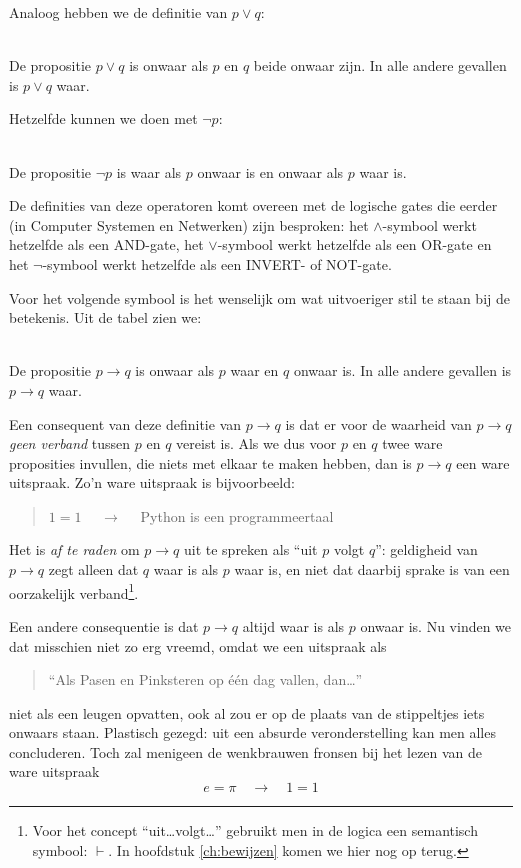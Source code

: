 Analoog hebben we de definitie van $p\lor q$:
\begin{definition}[Disjunctie]\label{def:disj}\mbox{}\\
De propositie $p\lor q$ is onwaar als $p$ en $q$ beide onwaar zijn. In alle andere gevallen is $p\lor q$ waar.
\end{definition}

Hetzelfde kunnen we doen met $\neg p$:
\begin{definition}[Negatie]\label{def:neg}\mbox{}\\
De propositie $\neg p$ is waar als $p$ onwaar is en onwaar als $p$ waar is.
\end{definition}

De definities van deze operatoren komt overeen met de logische gates die eerder (in Computer Systemen en Netwerken) zijn besproken: het $\land$-symbool werkt hetzelfde als een AND-gate, het $\lor$-symbool werkt hetzelfde als een OR-gate en het $\neg$-symbool werkt hetzelfde als een INVERT- of NOT-gate.

Voor het volgende symbool is het wenselijk om wat uitvoeriger stil te staan bij de betekenis. Uit de tabel zien we:
\begin{definition}[Implicatie]\label{def:impl}\mbox{}\\
De propositie $p\rightarrow q$ is onwaar als $p$ waar en $q$ onwaar is. In alle andere gevallen is $p\rightarrow q$ waar.
\end{definition}

Een consequent van deze definitie van $p\rightarrow q$ is dat er voor de waarheid van $p\rightarrow q$ \textit{geen verband} tussen $p$ en $q$ vereist is. Als we dus voor $p$ en $q$ twee ware proposities invullen, die niets met elkaar te maken hebben, dan is $p\rightarrow q$ een ware uitspraak. Zo'n ware uitspraak is bijvoorbeeld:
\begin{quote}
$1=1$ $\quad\rightarrow\quad$ Python is een programmeertaal
\end{quote}

Het is \textit{af te raden} om $p\rightarrow q$ uit te spreken als \enquote{uit $p$ volgt $q$}: geldigheid van $p\rightarrow q$ zegt alleen dat $q$ waar is als $p$ waar is, en niet dat daarbij sprake is van een oorzakelijk verband\footnote{Voor het concept \enquote{uit\ldots volgt\ldots} gebruikt men in de logica een semantisch symbool: $\vdash$. In hoofdstuk \ref{ch:bewijzen} komen we hier nog op terug.}.

Een andere consequentie is dat $p\rightarrow q$ altijd waar is als $p$ onwaar is. Nu vinden we dat misschien niet zo erg vreemd, omdat we een uitspraak als
\begin{quote}
\enquote{Als Pasen en Pinksteren op \'e\'en dag vallen, dan\ldots}
\end{quote}
niet als een leugen opvatten, ook al zou er op de plaats van de stippeltjes iets onwaars staan. Plastisch gezegd: uit een absurde veronderstelling kan men alles concluderen. Toch zal menigeen de wenkbrauwen fronsen bij het lezen van de ware uitspraak
$$e=\pi\quad\rightarrow\quad 1=1$$

